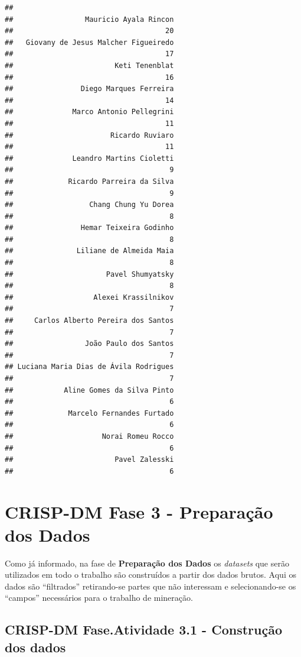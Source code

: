 \documentclass[]{article}
\begin{document}
\begin{verbatim}
## 
##                 Mauricio Ayala Rincon 
##                                    20 
##   Giovany de Jesus Malcher Figueiredo 
##                                    17 
##                        Keti Tenenblat 
##                                    16 
##                Diego Marques Ferreira 
##                                    14 
##              Marco Antonio Pellegrini 
##                                    11 
##                       Ricardo Ruviaro 
##                                    11 
##              Leandro Martins Cioletti 
##                                     9 
##             Ricardo Parreira da Silva 
##                                     9 
##                  Chang Chung Yu Dorea 
##                                     8 
##                Hemar Teixeira Godinho 
##                                     8 
##               Liliane de Almeida Maia 
##                                     8 
##                      Pavel Shumyatsky 
##                                     8 
##                   Alexei Krassilnikov 
##                                     7 
##     Carlos Alberto Pereira dos Santos 
##                                     7 
##                 João Paulo dos Santos 
##                                     7 
## Luciana Maria Dias de Ávila Rodrigues 
##                                     7 
##            Aline Gomes da Silva Pinto 
##                                     6 
##             Marcelo Fernandes Furtado 
##                                     6 
##                     Norai Romeu Rocco 
##                                     6 
##                        Pavel Zalesski 
##                                     6
\end{verbatim}

\section{\texorpdfstring{CRISP-DM Fase 3 - \textbf{Preparação dos
Dados}}{CRISP-DM Fase 3 - Preparação dos Dados}}\label{crisp-dm-fase-3---preparacao-dos-dados}

Como já informado, na fase de \textbf{Preparação dos Dados} os
\emph{datasets} que serão utilizados em todo o trabalho são construídos
a partir dos dados brutos. Aqui os dados são ``filtrados'' retirando-se
partes que não interessam e selecionando-se os ``campos'' necessários
para o trabalho de mineração.

\subsection{CRISP-DM Fase.Atividade 3.1 - Construção dos
dados}\label{crisp-dm-fase.atividade-3.1---construcao-dos-dados}
\end{document}
